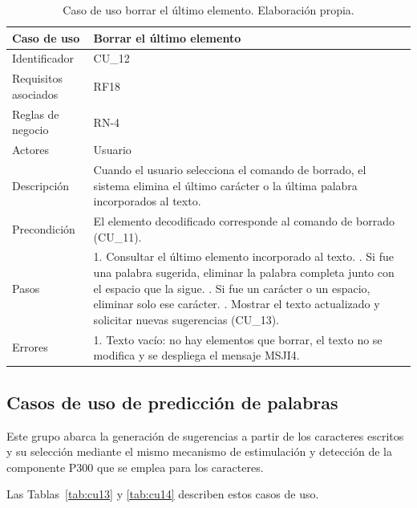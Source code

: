 \begin{table}[H]
\centering
\small
\begin{tabularx}{\textwidth}{|L{3.0cm}|Y|}
\hline
\textbf{Caso de uso} & \textbf{Borrar el último elemento} \\
\hline
Identificador & CU\_12 \\
\hline
Requisitos asociados & RF18 \\
\hline
Reglas de negocio & RN-4 \\
\hline
Actores & Usuario \\
\hline
Descripción & Cuando el usuario selecciona el comando de borrado, el sistema elimina el último carácter o la última palabra incorporados al texto. \\
\hline
Precondición & El elemento decodificado corresponde al comando de borrado (CU\_11). \\
\hline
Pasos & 1. Consultar el último elemento incorporado al texto. . Si fue una palabra sugerida, eliminar la palabra completa junto con el espacio que la sigue. . Si fue un carácter o un espacio, eliminar solo ese carácter. . Mostrar el texto actualizado y solicitar nuevas sugerencias (CU\_13). \\
\hline
Errores & 1. Texto vacío: no hay elementos que borrar, el texto no se modifica y se despliega el mensaje MSJI4. \\
\hline
\end{tabularx}
\caption{Caso de uso borrar el último elemento. Elaboración propia.}
\label{tab:cu12}
\end{table}


\subsection{Casos de uso de predicción de palabras}

Este grupo abarca la generación de sugerencias a partir de los caracteres escritos y su selección
mediante el mismo mecanismo de estimulación y detección de la componente P300 que se emplea para
los caracteres.

Las Tablas~\ref{tab:cu13} y \ref{tab:cu14} describen estos casos de uso.

